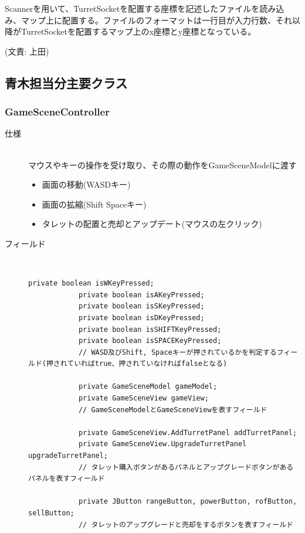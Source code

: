 \documentclass[11pt,a4j]{jarticle}
\begin{document}
Scannerを用いて、TurretSocketを配置する座標を記述したファイルを読み込み、マップ上に配置する。ファイルのフォーマットは一行目が入力行数、それ以降がTurretSocketを配置するマップ上のx座標とy座標となっている。

(文責: 上田)

\subsection{青木担当分主要クラス}
\subsubsection{GameSceneController}
\begin{description}
    \item[仕様]\mbox{}\\
          マウスやキーの操作を受け取り、その際の動作をGameSceneModelに渡す
          \begin{itemize}
              \item 画面の移動(WASDキー)
              \item 画面の拡縮(Shift Spaceキー)
              \item タレットの配置と売却とアップデート(マウスの左クリック)
          \end{itemize}
    \item[フィールド]\mbox{}\\
          \begin{lstlisting}[numbers=none]
            private boolean isWKeyPressed;
            private boolean isAKeyPressed;
            private boolean isSKeyPressed;
            private boolean isDKeyPressed;
            private boolean isSHIFTKeyPressed;
            private boolean isSPACEKeyPressed;
            // WASD及びShift, Spaceキーが押されているかを判定するフィールド(押されていればtrue、押されていなければfalseとなる)

            private GameSceneModel gameModel;
            private GameSceneView gameView;
            // GameSceneModelとGameSceneViewを表すフィールド

            private GameSceneView.AddTurretPanel addTurretPanel;
            private GameSceneView.UpgradeTurretPanel upgradeTurretPanel;
            // タレット購入ボタンがあるパネルとアップグレードボタンがあるパネルを表すフィールド

            private JButton rangeButton, powerButton, rofButton, sellButton;
            // タレットのアップグレードと売却をするボタンを表すフィールド


\end{lstlisting}
\end{description}
\end{document}
